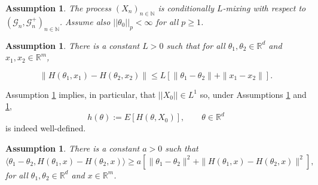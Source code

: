 \documentclass[a4paper]{article}
\newtheorem{remark}[theorem]{Remark}
\newtheorem{assumption}[theorem]{Assumption}
\begin{document}
\begin{assumption}\label{lll} The process 
$(X_n)_{n\in\mathbb{N}}$ is
conditionally $L$-mixing with respect to $(\mathcal{G}_n,\mathcal{G}_n^+)_{n\in\mathbb{N}}$. Assume also $||\theta_0||_p < \infty$ for all $p\geq 1$.
\end{assumption}

\begin{assumption}\label{lip}  There is a constant $L>0$ such that for all 
$\theta_1,\theta_2 \in \mathbb{R}^{d}$ and 
$x_1,x_2 \in \mathbb{R}^{{m}}$,
	
$$
	\|H(\theta_1,x_1)-H(\theta_2,x_2)\|\leq L[\|\theta_1-\theta_2\|+\|x_1-x_2\|].
	$$
\end{assumption}
Assumption \ref{lll} implies, in particular, that $||X_0||\in L^1$ so, under Assumptions \ref{lll} and \ref{lip}, 
$$h(\theta):=E[H(\theta,X_0)], \qquad \theta\in\mathbb{R}^{d}$$ is indeed well-defined.

\begin{assumption}\label{diss} There is a constant $a > 0$ such that
	\begin{equation}\label{montre}
	\langle \theta_1-\theta_2,H(\theta_1,x)-H(\theta_2,x)\rangle\geq
	a[\|\theta_1-\theta_2\|^2 + \|H(\theta_1,x)-H(\theta_2,x)\|^2],
	\end{equation}
	for all $\theta_1,\theta_2\in\mathbb{R}^{d}$ and $x\in\mathbb{R}^{{m}}$.
\end{assumption}

\end{document}
